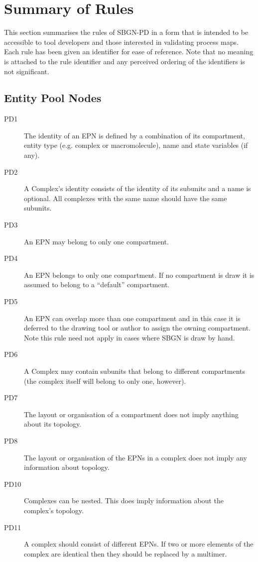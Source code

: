 \section{Summary of Rules}

This section summarises the rules of SBGN-PD in a form that is intended to be accessible to tool developers and those interested in validating process maps. Each rule has been given an identifier for ease of reference. Note that no meaning is attached to the rule identifier and any perceived ordering of the identifiers is not significant.

\subsection{Entity Pool Nodes}

\begin{description}
\item[PD1] The identity of an EPN is defined by a combination of its compartment, entity type (e.g. complex or macromolecule), name and state variables (if any).
\item[PD2] A Complex’s identity consists of the identity of its subunits and a name is optional. All complexes with the same name should have the same subunits.
\item[PD3] An EPN may belong to only one compartment.
\item[PD4] An EPN belongs to only one compartment. If no compartment is draw it is assumed to belong to a “default” compartment.
\item[PD5] An EPN can overlap more than one compartment and in this case it is deferred to the drawing tool or author to assign the owning compartment. Note this rule need not apply in cases where SBGN is draw by hand.
\item[PD6] A Complex may contain subunits that belong to different compartments (the complex itself will belong to only one, however).
\item[PD7] The layout or organisation of a compartment does not imply anything about its topology.
\item[PD8] The layout or organisation of the EPNs in a complex does not imply any information about topology.
\item[PD10] Complexes can be nested. This does imply information about the complex’s topology.
\item[PD11] A complex should consist of different EPNs. If two or more elements of the complex are identical then they should be replaced by a multimer.

\end{description}
